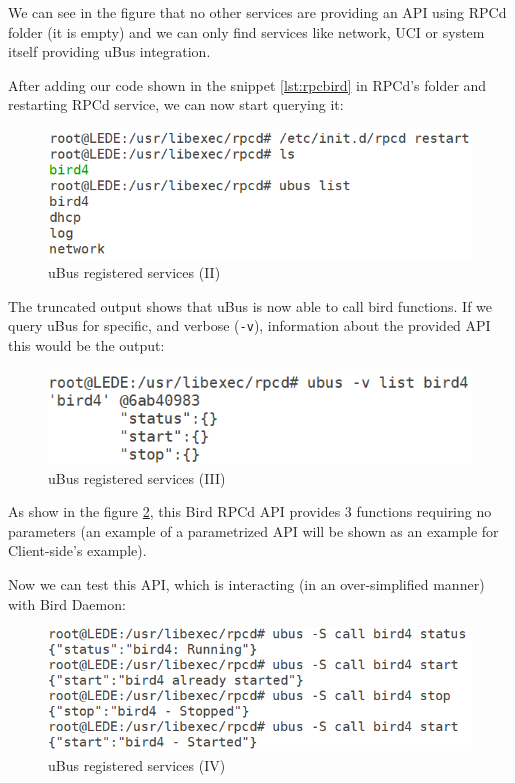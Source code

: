 We can see in the figure that no other services are providing an API using RPCd folder (it is empty) and we can only find services like network, UCI or system itself providing uBus integration.

After adding our code shown in the snippet \ref{lst:rpcbird} in RPCd's folder and restarting RPCd service, we can now start querying it:

\begin{figure}[H]
    \centering
    \includegraphics[width=\textwidth]{images/luci2/step2}
    \caption{uBus registered services (II)}
    \label{fig:ubusrs2}
\end{figure}

The truncated output shows that uBus is now able to call bird functions. If we query uBus for specific, and verbose (\texttt{-v}), information about the provided API this would be the output:

\begin{figure}[H]
    \centering
    \includegraphics[width=\textwidth]{images/luci2/step3}
    \caption{uBus registered services (III)}
    \label{fig:ubusrs3}
\end{figure}

As show in the figure \ref{fig:ubusrs3}, this Bird RPCd API provides 3 functions requiring no parameters (an example of a parametrized API will be shown as an example for Client-side's example).

Now we can test this API, which is interacting (in an over-simplified manner) with Bird Daemon:

\begin{figure}[H]
    \centering
    \includegraphics[width=\textwidth]{images/luci2/step4}
    \caption{uBus registered services (IV)}
    \label{fig:ubusrs4}
\end{figure}

